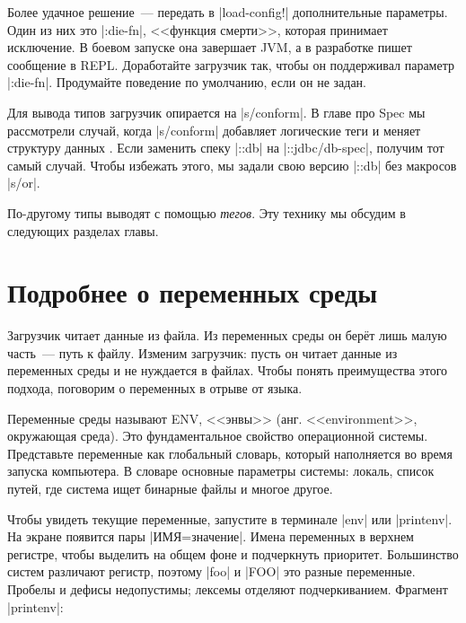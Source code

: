 
Более удачное решение~--- передать в \spverb|load-config!| дополнительные
параметры. Один из них это \spverb|:die-fn|, <<функция смерти>>, которая
принимает исключение. В боевом запуске она завершает JVM, а в разработке пишет
сообщение в REPL. Доработайте загрузчик так, чтобы он поддерживал параметр
\spverb|:die-fn|. Продумайте поведение по умолчанию, если он не задан.

Для вывода типов загрузчик опирается на \spverb|s/conform|. В главе про Spec мы
рассмотрели случай, когда \spverb|s/conform| добавляет логические теги и меняет
структуру данных . Если заменить спеку \spverb|::db|
на \spverb|::jdbc/db-spec|, получим тот самый случай. Чтобы избежать этого, мы
задали свою версию \spverb|::db| без макросов \spverb|s/or|.


По-другому типы выводят с помощью \emph{тегов}. Эту технику мы обсудим в
следующих разделах главы.

\section{Подробнее о переменных среды}


Загрузчик читает данные из файла. Из переменных среды он бер\"{е}т лишь малую
часть~--- путь к файлу. Изменим загрузчик: пусть он читает данные из переменных
среды и не нуждается в файлах. Чтобы понять преимущества этого подхода,
поговорим о переменных в отрыве от языка.

Переменные среды называют ENV, <<энвы>> (анг. <<environment>>, окружающая
среда). Это фундаментальное свойство операционной системы. Представьте
переменные как глобальный словарь, который наполняется во время запуска
компьютера. В словаре основные параметры системы: локаль, список путей, где
система ищет бинарные файлы и многое другое.


Чтобы увидеть текущие переменные, запустите в терминале \spverb|env| или
\spverb|printenv|. На экране появится пары \spverb|ИМЯ=значение|. Имена
переменных в верхнем регистре, чтобы выделить на общем фоне и подчеркнуть
приоритет. Большинство систем различают регистр, поэтому \spverb|foo| и
\spverb|FOO| это разные переменные. Пробелы и дефисы недопустимы; лексемы
отделяют подчеркиванием. Фрагмент \spverb|printenv|:

